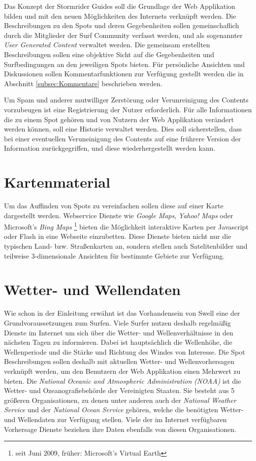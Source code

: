 Das Konzept der Stormrider Guides soll die Grundlage der Web
Applikation bilden und mit den neuen Möglichkeiten des Internets
verknüpft werden. Die Beschreibungen zu den Spots und deren
Gegebenheiten sollen gemeinschaflich durch die Mitglieder der Surf
Community verfasst werden, und als sogenannter \textit{User Generated
  Content} verwaltet werden. Die gemeinsam erstellten Beschreibungen
sollen eine objektive Sicht auf die Gegebenheiten und Surfbedingungen
an den jeweiligen Spots bieten. Für persönliche Ansichten und
Diskussionen sollen Kommentarfunktionen zur Verfügung gestellt werden
die in Abschnitt \ref{subsec:Kommentare} beschrieben werden.

Um Spam und anderer mutwilliger Zerstörung oder Verunreinigung des
Contents vorzubeugen ist eine Registrierung der Nutzer
erforderlich. Für alle Informationen die zu einem Spot gehören und von
Nutzern der Web Applikation verändert werden können, soll eine
Historie verwaltet werden. Dies soll sicherstellen, dass bei einer
eventuellen Veruneinigung des Contents auf eine frührere Version der
Information zurückgegriffen, und diese wiederhergestellt werden kann.

\section{Kartenmaterial}

Um das Auffinden von Spots zu vereinfachen sollen diese auf einer
Karte dargestellt werden. Webservice Dienste wie \textit{Google Maps},
\textit{Yahoo! Maps} oder Microsoft's \textit{Bing Maps}
\footnote{seit Juni 2009, früher: Microsoft's Virtual Earth} bieten
die Möglichkeit interaktive Karten per Java\-script oder Flash in eine
Webseite einzubetten. Diese Dienste bieten nicht nur die typischen
Land- bzw. Straßenkarten an, sondern stellen auch Satelitenbilder und
teilweise 3-dimensionale Ansichten für bestimmte Gebiete zur
Verfügung.

\section{Wetter- und Wellendaten}

Wie schon in der Einleitung erwähnt ist das Vorhandensein von Swell
eine der Grundvoraussetzungen zum Surfen. Viele Surfer nutzen deshalb
regelmäßig Dienste im Internet um sich über die Wetter- und
Wellenverhältnisse in den nächsten Tagen zu informieren. Dabei ist
hauptsächlich die Wellenhöhe, die Wellenperiode und die Stärke und
Richtung des Windes von Interesse. Die Spot Beschreibungen sollen
deshalb mit aktuellen Wetter- und Wellenvorhersagen verknüpft werden,
um den Benutzern der Web Applikation einen Mehrwert zu bieten. Die
\textit{National Oceanic and Atmospheric Administration (NOAA)} ist
die Wetter- und Ozeanografiebehörde der Vereinigten Staaten. Sie
besteht aus 5 größeren Organisationen, zu denen unter anderen auch der
\textit{National Weather Service} und der \textit{National Ocean
  Service} gehören, welche die benötigten Wetter- und Wellendaten zur
Verfügung stellen. Viele der im Internet verfügbaren Vorhersage
Dienste beziehen ihre Daten ebenfalls von diesen Organisationen.

